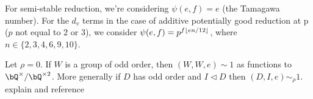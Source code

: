 \begin{example}
For semi-stable reduction, we're considering $\psi(e, f) = e$ (the Tamagawa number). For the $d_v$ terms in the case of additive potentially good reduction at p ($p$ not equal to $2$ or $3$), we consider $\psi(e, f) = p^{f \lfloor e n /12\rfloor}$, where $n \in \{2,3,4,6,9,10\}$.
\end{example}

\begin{example}\label{trivial-on-brauer}
    Let $\rho = 0$. If $W$ is a group of odd order, then $(W, W, e) \sim 1$ as functions to $\bQ^{\times} / \bQ^{\times 2}$.
    More generally if $D$ has odd order and $I \triangleleft D$ then $(D, I, e) \sim_{\rho} 1$. {\color{red} explain and reference}
\end{example}


